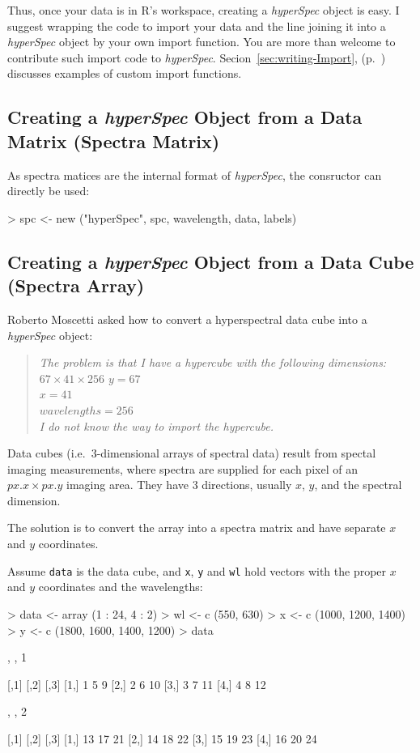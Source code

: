 \documentclass[english, a4paper, 10pt, headings=small, DIV11]{scrartcl}
\renewenvironment{Schunk}{\vspace{0pt}\begin{small}}{\end{small}\vspace{0pt}}
\newcommand{\Rcode}[2][]{\texorpdfstring{\nohyphens{#1\texttt{#2}}}{#2}}
\newcommand{\Rclass}[1]{\texorpdfstring{\nohyphens{\textit{#1}}}{#1}}
\newcommand{\phy}{\texorpdfstring{\nohyphens{\textit{hyperSpec}}}{hyperSpec}\xspace}
\newcommand{\chy}{\Rclass{hyperSpec}\xspace}
\begin{document}
Thus, once your data is in R's workspace, creating a \chy object is easy. I suggest wrapping the code
to import your data and the line joining it into a \chy object by your own import function. You are
more than welcome to contribute such import code to \phy. Secion~\ref{sec:writing-Import},
(p.~\pageref{sec:writing-Import}) discusses examples of custom import functions.

\subsection{Creating a \chy Object from a Data Matrix (Spectra Matrix)}
As spectra matices are the internal format of \chy, the consructor can directly be used:
\begin{Schunk}
\begin{Sinput}
> spc <- new ("hyperSpec", spc, wavelength, data, labels)
\end{Sinput}
\end{Schunk}

\subsection{Creating a \chy Object from a Data Cube (Spectra Array)}
Roberto Moscetti asked how to convert a hyperspectral data cube into a \chy object:
\begin{quote}
  \emph{The problem is that I have a hypercube with the following dimensions: $67 \times 41 \times 256$
$y = 67$\\
$x = 41$\\
$wavelengths = 256$\\
I do not know the way to import the hypercube.}
\end{quote}

Data cubes (i.e.\ 3-dimensional arrays of spectral data) result from spectal imaging measurements,
where spectra are supplied for each pixel of an $px.x \times px.y$ imaging area. They have 3
directions, usually $x$, $y$, and the spectral dimension.

The solution is to convert the array into a spectra matrix and have separate $x$ and $y$ coordinates.

Assume \Rcode{data} is the data cube, and \Rcode{x}, \Rcode{y} and \Rcode{wl} hold vectors with the proper $x$ and $y$ coordinates and the wavelengths:
\begin{Schunk}
\begin{Sinput}
> data <- array (1 : 24, 4 : 2)
> wl <- c (550, 630)
> x <- c (1000, 1200, 1400)
> y <- c (1800, 1600, 1400, 1200)
> data
\end{Sinput}
\begin{Soutput}
, , 1

     [,1] [,2] [,3]
[1,]    1    5    9
[2,]    2    6   10
[3,]    3    7   11
[4,]    4    8   12

, , 2

     [,1] [,2] [,3]
[1,]   13   17   21
[2,]   14   18   22
[3,]   15   19   23
[4,]   16   20   24
\end{Soutput}
\end{Schunk}
\end{document}

